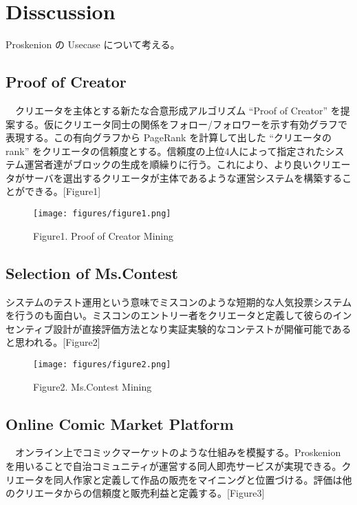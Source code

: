 \hypertarget{disscussion}{%
\section{Disscussion}\label{disscussion}}

Proskenion の Usecase について考える。

\hypertarget{proof-of-creator}{%
\subsection{Proof of Creator}\label{proof-of-creator}}

　クリエータを主体とする新たな合意形成アルゴリズム ``Proof of Creator''
を提案する。仮にクリエータ同士の関係をフォロー/フォロワーを示す有効グラフで表現する。この有向グラフから
PageRank を計算して出した ``クリエータのrank''
をクリエータの信頼度とする。信頼度の上位4人によって指定されたシステム運営者達がブロックの生成を順繰りに行う。これにより、より良いクリエータがサーバを選出するクリエータが主体であるような運営システムを構築することができる。{[}Figure1{]}

\begin{figure}
\centering
\texttt{[image: figures/figure1.png]}
\caption{Figure1. Proof of Creator Mining}
\end{figure}

\hypertarget{selection-of-ms.contest}{%
\subsection{Selection of Ms.Contest}\label{selection-of-ms.contest}}

システムのテスト運用という意味でミスコンのような短期的な人気投票システムを行うのも面白い。ミスコンのエントリー者をクリエータと定義して彼らのインセンティブ設計が直接評価方法となり実証実験的なコンテストが開催可能であると思われる。{[}Figure2{]}

\begin{figure}
\centering
\texttt{[image: figures/figure2.png]}
\caption{Figure2. Ms.Contest Mining}
\end{figure}

\hypertarget{online-comic-market-platform}{%
\subsection{Online Comic Market
Platform}\label{online-comic-market-platform}}

　オンライン上でコミックマーケットのような仕組みを模擬する。Proskenion
を用いることで自治コミュニティが運営する同人即売サービスが実現できる。クリエータを同人作家と定義して作品の販売をマイニングと位置づける。評価は他のクリエータからの信頼度と販売利益と定義する。{[}Figure3{]}

